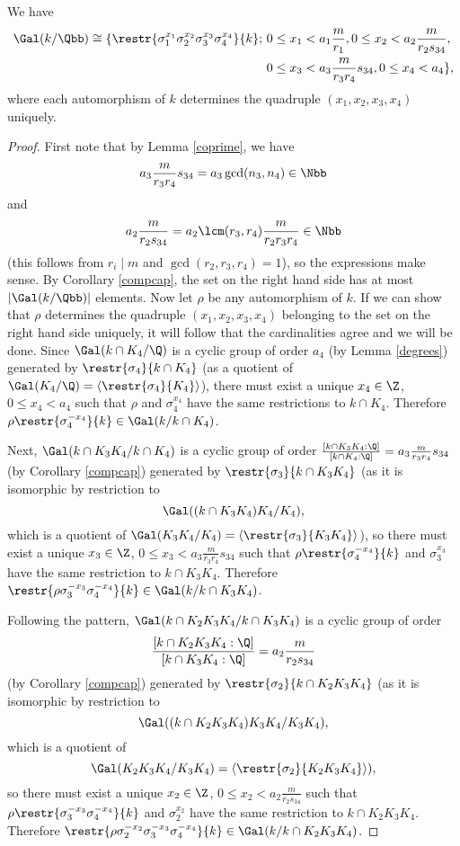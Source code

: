 \begin{prop}\label{gal}
We have 
\begin{equation*}
\begin{split}
\Gal(k/\Qbb)\cong
 \{\restr{\sigma_1^{x_1}\sigma_2^{x_2}\sigma_3^{x_3}\sigma_4^{x_4}}{k};~ & 0\leq x_1<a_1\frac{m}{r_1}, 0\leq x_2<a_2\frac{m}{r_2s_{34}}, \\ & 0\leq x_3<a_3\frac{m}{r_3r_4}s_{34},0\leq x_4<a_4\},
\end{split}
\end{equation*}
where each automorphism of $k$ determines the quadruple $(x_1,x_2,x_3,x_4)$ uniquely.
\end{prop}
\begin{proof}
First note that by Lemma \ref{coprime}, we have $$a_3\frac{m}{r_3r_4}s_{34}=a_3\gcd(n_3,n_4)\in\Nbb$$ and $$a_2\frac{m}{r_2s_{34}}=a_2\lcm(r_3,r_4)\frac{m}{r_2r_3r_4}\in\Nbb$$ (this follows from $r_i\mid m$ and $\gcd(r_2,r_3,r_4)=1$), so the expressions make sense. By Corollary \ref{compcap}, the set on the right hand side has at most $|\Gal(k/\Qbb)|$ elements. Now let $\rho$ be any automorphism of $k$. If we can show that $\rho$ determines the quadruple $(x_1,x_2,x_3,x_4)$ belonging to the set on the right hand side uniquely, it will follow that the cardinalities agree and we will be done. Since $\Gal(k\cap K_4/\Q)$ is a cyclic group of order $a_4$ (by Lemma \ref{degrees}) generated by $\restr{\sigma_4}{k\cap K_4}$ (as a quotient of $\Gal(K_4/\Q)=\langle \restr{\sigma_4}{K_4}\rangle$), there must exist a unique $x_4\in \Z$, $0\leq x_4<a_4$ such that $\rho$ and $\sigma_4^{x_4}$ have the same restrictions to $k\cap K_4$. Therefore $\rho\restr{\sigma_4^{-x_4}}{k}\in \Gal(k/k\cap K_4)$. 

Next, $\Gal(k\cap K_3K_4/k\cap K_4)$ is a cyclic group of order $\frac{[k\cap K_3K_4:\Q]}{[k\cap K_4:\Q]}=a_3\frac{m}{r_3r_4}s_{34}$ (by Corollary \ref{compcap}) generated by $\restr{\sigma_3}{k\cap K_3K_4}$ (as it is isomorphic by restriction to $$\Gal((k\cap K_3K_4)K_4 / K_4),$$ which is a quotient of $\Gal(K_3K_4/K_4)=\langle \restr{\sigma_3}{K_3K_4}\rangle$), so there must exist a unique $x_3\in \Z$, $0\leq x_3<a_3\frac{m}{r_3r_4}s_{34}$ such that $\rho \restr{\sigma_4^{-x_4}}{k}$ and $\sigma_3^{x_3}$ have the same restriction to $k\cap K_3K_4$. Therefore $\restr{\rho\sigma_3^{-x_3}\sigma_4^{-x_4}}{k}\in \Gal(k/k\cap K_3K_4)$.

Following the pattern, $\Gal(k\cap K_2K_3K_4/k\cap K_3K_4)$ is a cyclic group of order 
$$\frac{[k\cap K_2K_3K_4:\Q]}{[k\cap K_3K_4:\Q]}=a_2\frac{m}{r_2s_{34}}$$ (by Corollary \ref{compcap}) generated by $\restr{\sigma_2}{k\cap K_2K_3K_4}$ (as it is isomorphic by restriction to $$\Gal((k\cap K_2K_3K_4)K_3K_4 / K_3K_4),$$ which is a quotient of $$\Gal(K_2K_3K_4/K_3K_4)=\langle \restr{\sigma_2}{K_2K_3K_4}\rangle),$$ so there must exist a unique $x_2\in \Z$, $0\leq x_2<a_2\frac{m}{r_2s_{34}}$ such that $\rho\restr{\sigma_3^{-x_3}\sigma_4^{-x_4}}{k}$ and $\sigma_2^{x_2}$ have the same restriction to $k\cap K_2K_3K_4$. Therefore $\restr{\rho\sigma_2^{-x_2}\sigma_3^{-x_3}\sigma_4^{-x_4}}{k}\in \Gal(k/k\cap K_2K_3K_4)$.


\end{proof}
